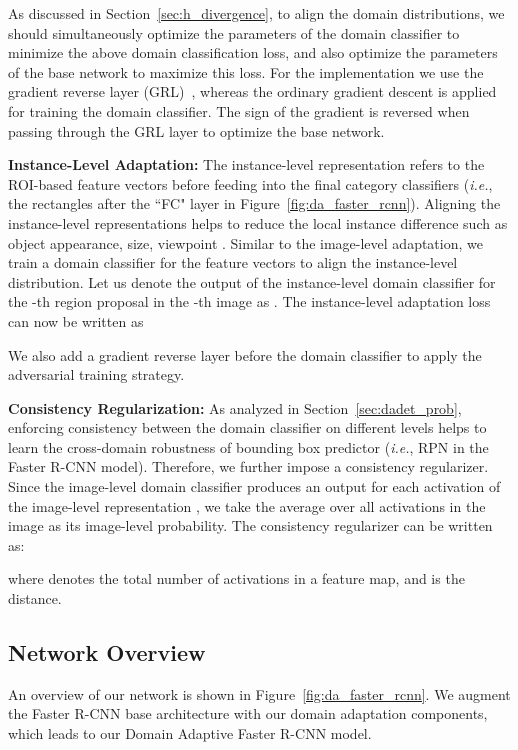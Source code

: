 \documentclass[10pt,twocolumn,letterpaper]{article}
\def\ie{\emph{i.e.}}
\begin{document}
As discussed in Section~\ref{sec:h_divergence}, to align the domain distributions, we should simultaneously optimize the parameters of the domain classifier to minimize the above domain classification loss, and also optimize the parameters of the base network to maximize this loss. For the implementation we use the gradient reverse layer (GRL)~\cite{ganin2015unsupervised}, whereas the ordinary gradient descent is applied for training the domain classifier. The sign of the gradient is reversed when passing through the GRL layer to optimize the base network. 

\textbf{Instance-Level Adaptation: } The instance-level representation refers to the ROI-based feature vectors before feeding into the final category classifiers (\ie, the rectangles after the ``FC" layer in Figure~\ref{fig:da_faster_rcnn}). Aligning the instance-level representations helps to reduce the local instance difference such as object appearance, size, viewpoint \etc. Similar to the image-level adaptation, we train a domain classifier for the feature vectors to align the instance-level distribution. Let us denote the output of the instance-level domain classifier for the -th region proposal in the -th image as . The instance-level adaptation loss can now be written as

We also add a gradient reverse layer before the domain classifier to apply the adversarial training strategy. 

\textbf{Consistency Regularization: } As analyzed in Section~\ref{sec:dadet_prob}, enforcing consistency between the domain classifier on different levels helps to learn the cross-domain robustness of bounding box predictor (\ie, RPN in the Faster R-CNN model). Therefore, we further impose a consistency regularizer. Since the image-level domain classifier produces an output for each activation of the image-level representation , we take the average over all activations in the image as its image-level probability. The consistency regularizer can be written as: 

where  denotes the total number of activations in a feature map, and  is the  distance. 

\subsection{Network Overview}
An overview of our network is shown in Figure~\ref{fig:da_faster_rcnn}. We augment the Faster R-CNN base architecture with our domain adaptation components, which leads to our Domain Adaptive Faster R-CNN model.
\end{document}
